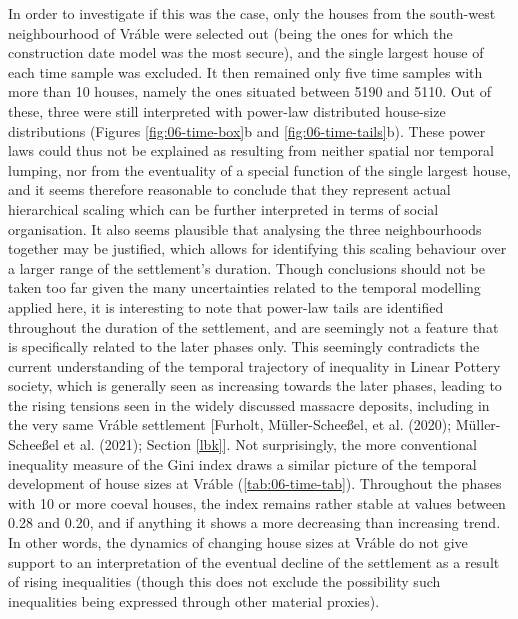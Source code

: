 \documentclass[
  12pt,
]{book}
\begin{document}
In order to investigate if this was the case, only the houses from the south-west neighbourhood of Vráble were selected out (being the ones for which the construction date model was the most secure), and the single largest house of each time sample was excluded. It then remained only five time samples with more than 10 houses, namely the ones situated between 5190 and 5110. Out of these, three were still interpreted with power-law distributed house-size distributions (Figures \ref{fig:06-time-box}b and \ref{fig:06-time-tails}b). These power laws could thus not be explained as resulting from neither spatial nor temporal lumping, nor from the eventuality of a special function of the single largest house, and it seems therefore reasonable to conclude that they represent actual hierarchical scaling which can be further interpreted in terms of social organisation. It also seems plausible that analysing the three neighbourhoods together may be justified, which allows for identifying this scaling behaviour over a larger range of the settlement's duration. Though conclusions should not be taken too far given the many uncertainties related to the temporal modelling applied here, it is interesting to note that power-law tails are identified throughout the duration of the settlement, and are seemingly not a feature that is specifically related to the later phases only. This seemingly contradicts the current understanding of the temporal trajectory of inequality in Linear Pottery society, which is generally seen as increasing towards the later phases, leading to the rising tensions seen in the widely discussed massacre deposits, including in the very same Vráble settlement {[}Furholt, Müller-Scheeßel, et al. (2020); Müller-Scheeßel et al. (2021); Section \ref{lbk}{]}. Not surprisingly, the more conventional inequality measure of the Gini index draws a similar picture of the temporal development of house sizes at Vráble (\ref{tab:06-time-tab}). Throughout the phases with 10 or more coeval houses, the index remains rather stable at values between 0.28 and 0.20, and if anything it shows a more decreasing than increasing trend. In other words, the dynamics of changing house sizes at Vráble do not give support to an interpretation of the eventual decline of the settlement as a result of rising inequalities (though this does not exclude the possibility such inequalities being expressed through other material proxies).
\end{document}
